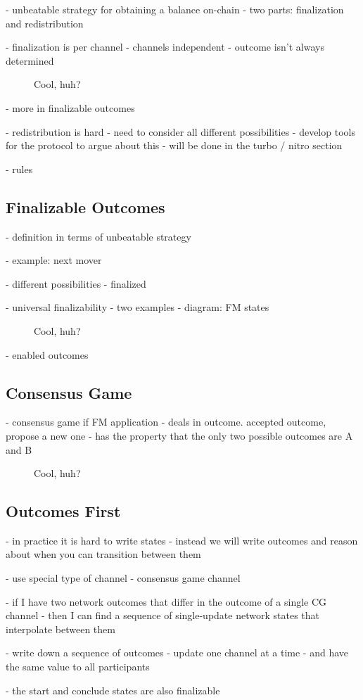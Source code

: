 - unbeatable strategy for obtaining a balance on-chain
- two parts: finalization and redistribution

- finalization is per channel - channels independent
- outcome isn't always determined
\begin{figure}[h]\centering
  \makebox[\textwidth][c]{}
  \caption{Cool, huh?}
\end{figure}


- more in finalizable outcomes

- redistribution is hard
- need to consider all different possibilities
- develop tools for the protocol to argue about this
- will be done in the turbo / nitro section

- rules

\subsection{Finalizable Outcomes}

- definition in terms of unbeatable strategy

- example: next mover

- different possibilities
  - finalized

- universal finalizability
- two examples
- diagram: FM states
\begin{figure}[h]\centering
  \makebox[\textwidth][c]{}
  \caption{Cool, huh?}
\end{figure}

- enabled outcomes

\subsection{Consensus Game}

- consensus game if FM application
- deals in outcome. accepted outcome, propose a new one
- has the property that the only two possible outcomes are A and B
\begin{figure}[h]\centering
  \makebox[\textwidth][c]{}
  \caption{Cool, huh?}
\end{figure}

\subsection{Outcomes First}

- in practice it is hard to write states
- instead we will write outcomes and reason about when you can transition between them

- use special type of channel - consensus game channel


- if I have two network outcomes that differ in the outcome of a single CG channel
- then I can find a sequence of single-update network states that interpolate between them

- write down a sequence of outcomes
- update one channel at a time
- and have the same value to all participants

- the start and conclude states are also finalizable
